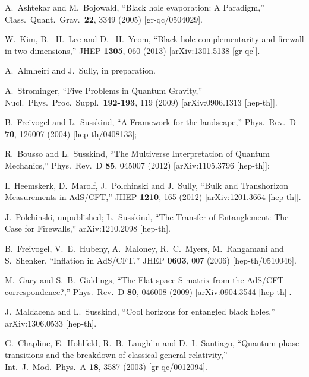 \documentclass[12pt]{article}
\begin{document}
\begin{thebibliography}{99}
  A.~Ashtekar and M.~Bojowald,
  ``Black hole evaporation: A Paradigm,''
  Class.\ Quant.\ Grav.\  {\bf 22}, 3349 (2005)
  [gr-qc/0504029].
  
  W.~Kim, B.~-H.~Lee and D.~-H.~Yeom,
  ``Black hole complementarity and firewall in two dimensions,''
  JHEP {\bf 1305}, 060 (2013)
  [arXiv:1301.5138 [gr-qc]].
  
A.~Almheiri and J.~Sully, in preparation.

  A.~Strominger,
  ``Five Problems in Quantum Gravity,''
  Nucl.\ Phys.\ Proc.\ Suppl.\  {\bf 192-193}, 119 (2009)
  [arXiv:0906.1313 [hep-th]].

  B.~Freivogel and L.~Susskind,
  ``A Framework for the landscape,''
  Phys.\ Rev.\ D {\bf 70}, 126007 (2004)
  [hep-th/0408133];

  R.~Bousso and L.~Susskind,
  ``The Multiverse Interpretation of Quantum Mechanics,''
  Phys.\ Rev.\ D {\bf 85}, 045007 (2012)
  [arXiv:1105.3796 [hep-th]];

  I.~Heemskerk, D.~Marolf, J.~Polchinski and J.~Sully,
  ``Bulk and Transhorizon Measurements in AdS/CFT,''
  JHEP {\bf 1210}, 165 (2012)
  [arXiv:1201.3664 [hep-th]].

J.~Polchinski, unpublished;
  L.~Susskind,
  ``The Transfer of Entanglement: The Case for Firewalls,''
  arXiv:1210.2098 [hep-th].

  B.~Freivogel, V.~E.~Hubeny, A.~Maloney, R.~C.~Myers, M.~Rangamani and S.~Shenker,
  ``Inflation in AdS/CFT,''
  JHEP {\bf 0603}, 007 (2006)
  [hep-th/0510046].

  M.~Gary and S.~B.~Giddings,
  ``The Flat space S-matrix from the AdS/CFT correspondence?,''
  Phys.\ Rev.\ D {\bf 80}, 046008 (2009)
  [arXiv:0904.3544 [hep-th]].

  J.~Maldacena and L.~Susskind,
  ``Cool horizons for entangled black holes,''
  arXiv:1306.0533 [hep-th].

  G.~Chapline, E.~Hohlfeld, R.~B.~Laughlin and D.~I.~Santiago,
  ``Quantum phase transitions and the breakdown of classical general relativity,''
  Int.\ J.\ Mod.\ Phys.\ A {\bf 18}, 3587 (2003)
  [gr-qc/0012094].


\end{thebibliography}
\end{document}
